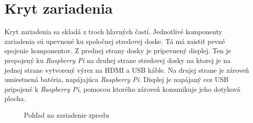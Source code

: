     \section{Kryt zariadenia}
        Kryt zariadenia sa skladá z troch hlavných častí. Jednotlivé komponenty zariadenia sú upevnené ku spoločnej stredovej doske. Tá má zaistiť pevné spojenie komponentov. Z prednej strany dosky je pripevnený displej. Ten je prepojený ku \emph{Raspberry Pi} na druhej strane stredovej dosky na ktorej je na jednej strane vytvorený výrez na HDMI a USB káble. Na drujej strane je zároveň umiestnená batéria, napájajúca \emph{Raspberry Pi}. Displej je napájaný cez USB pripojené k \emph{Raspberry Pi}, pomocou ktorého zároveň komunikuje jeho dotyková plocha.

        \begin{figure}[H]
            \centering
            \caption{Pohľad na zariadenie zpredu}
        \end{figure}

